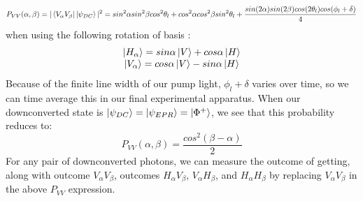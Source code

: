 \documentclass{article}
\begin{document}
    \begin{equation}
        P_{VV}(\alpha,\beta) = |\left\langle{V_\alpha V_\beta}\right\vert\left\vert{\psi_{DC}}\right\rangle|^2 = sin^2\alpha sin^2\beta cos^2 \theta_l + cos^2\alpha cos^2\beta sin^2 \theta_l + \frac{sin(2\alpha) sin(2\beta)cos(2\theta_l)cos(\phi_l + \delta)}{4}
    \end{equation}
    when using the following rotation of basis \cite{deh}:
    \begin{equation}
        \begin{array}{c}
        \left\vert{H_\alpha}\right\rangle = sin\alpha \left\vert{V}\right\rangle + cos\alpha \left\vert{H}\right\rangle\\
            \left\vert{V_\alpha}\right\rangle = cos\alpha \left\vert{V}\right\rangle - sin\alpha \left\vert{H}\right\rangle
        \end{array}
    \end{equation}
    Because of the finite line width of our pump light, $\phi_l + \delta$ varies over time, so we can time average this in our final experimental apparatus. When our downconverted state is $\left\vert{\psi_{DC}}\right\rangle = \left\vert{\psi_{EPR}}\right\rangle = \left\vert{\Phi^+}\right\rangle$, we see that this probability reduces to: \begin{equation}
        P_{VV}(\alpha,\beta) = \frac{cos^2(\beta - \alpha)}{2}
    \end{equation}
    For any pair of downconverted photons, we can measure the outcome of getting, along with outcome $V_\alpha V_\beta$, outcomes $H_\alpha V_\beta$, $V_\alpha H_\beta$, and $H_\alpha H_\beta$ by replacing $V_\alpha V_\beta$ in the above $P_{VV}$ expression.
    
\end{document}
